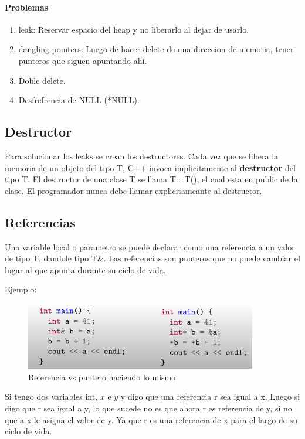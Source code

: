 \documentclass[11pt]{article}
\begin{document}
\paragraph{Problemas}
\begin{enumerate}
    \item leak: Reservar espacio del heap y no liberarlo al dejar de usarlo.
    \item dangling pointers: Luego de hacer delete de una direccion de memoria, tener
        punteros que siguen apuntando ahi.
    \item Doble delete.
    \item Desfrefrencia de NULL (*NULL).
\end{enumerate}

\subsection{Destructor}
Para solucionar los leaks se crean los destructores.
Cada vez que se libera la memoria de un objeto del tipo T, C++ invoca implicitamente
al \textbf{destructor} del tipo T.
El destructor de una clase T se llama T::~T(), el cual esta en public de la clase.
El programador nunca debe llamar explicitameante al destructor.

\subsection{Referencias}
Una variable local o parametro se puede declarar como una referencia a un valor de
tipo T, dandole tipo T\&.
Las referencias son punteros que no puede cambiar el lugar al que apunta
durante su ciclo de vida.

Ejemplo:
\begin{figure}[h]
    \centering
    \includegraphics[width=0.9\textwidth]{referencia.png}
    \caption{Referencia vs puntero  haciendo lo mismo.}
    \label{fig:ref}
\end{figure}

Si tengo dos variables int, $x$ e $y$ y digo que una referencia r sea igual a x.
Luego si digo que r sea igual a y, lo que sucede no es que ahora r es referencia de
y, si no que a x le asigna el valor de y. Ya que r es una referencia de x para el
largo de su ciclo de vida.
\end{document}

